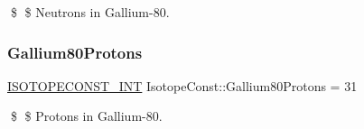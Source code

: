 \$ \$ Neutrons in Gallium-\/80. \mbox{\label{group___isotope_const-_gallium-_ga80_gabface17e77a7c280082dc8d4bc38756f}} 
\subsubsection{\texorpdfstring{Gallium80\+Protons}{Gallium80Protons}}
{\footnotesize\ttfamily \mbox{\hyperlink{group___isotope_const-_macros_ga5f18360b3e99483a35c32d789e62621c}{I\+S\+O\+T\+O\+P\+E\+C\+O\+N\+S\+T\+\_\+\+I\+NT}} Isotope\+Const\+::\+Gallium80\+Protons = 31}

\$ \$ Protons in Gallium-\/80. 
